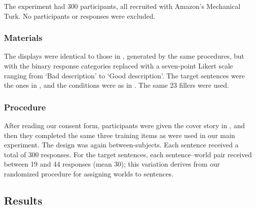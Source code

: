 \documentclass[leqno,12pt]{article}
\begin{document}
\begin{appendix}
The experiment had 300 participants, all recruited with Amazon's
Mechanical Turk. No participants or responses were excluded.

\subsubsection{Materials}

The displays were identical to those in ,
generated by the same procedures, but with the binary response
categories replaced with a seven-point Likert scale ranging from `Bad
description' to `Good description'. The target sentences were the ones
in , and the conditions were as in . The same 23
fillers were used.

\subsubsection{Procedure} 

After reading our consent form, participants were given the cover
story in , and then they completed the same three
training items as were used in our main experiment. The design was
again between-subjects.  Each sentence received a total of 300
responses. For the target sentences, each sentence--world pair
received between 19 and 44 responses (mean 30); this variation derives
from our randomized procedure for assigning worlds to sentences.


\subsection{Results}


\end{appendix}
\end{document}
